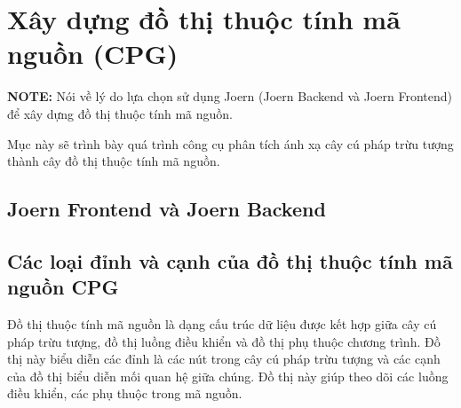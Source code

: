 \section{Xây dựng đồ thị thuộc tính mã nguồn (CPG)}

\textbf{NOTE:} Nói về lý do lựa chọn sử dụng Joern (Joern Backend và Joern Frontend) để xây dựng đồ thị thuộc tính mã nguồn.

Mục này sẽ trình bày quá trình công cụ phân tích ánh xạ cây cú pháp trừu tượng
thành cây đồ thị thuộc tính mã nguồn.

\subsection{Joern Frontend và Joern Backend}

\subsection{Các loại đỉnh và cạnh của đồ thị thuộc tính mã nguồn CPG}

Đồ thị thuộc tính mã nguồn là dạng cấu trúc dữ liệu được kết hợp giữa cây cú pháp trừu tượng, đồ thị luồng điều khiển và đồ thị phụ thuộc chương trình. Đồ thị này biểu diễn các đỉnh là các nút trong cây cú pháp trừu tượng và các cạnh của đồ thị biểu diễn mối quan hệ giữa chúng. Đồ thị này giúp theo dõi các luồng điều khiển, các phụ thuộc trong mã nguồn.

